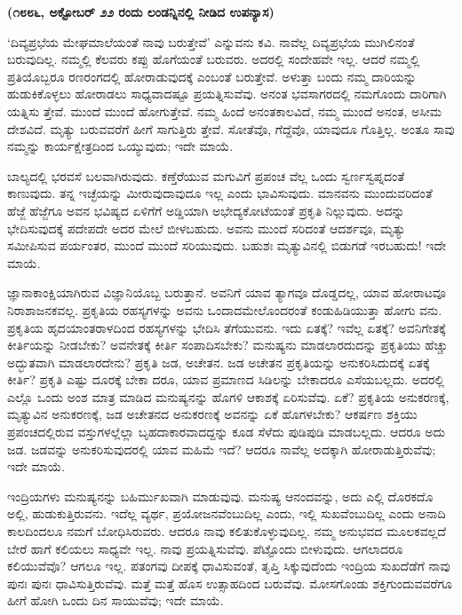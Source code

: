 \centerline{\textbf{(೧೮೮೬, ಅಕ್ಟೋಬರ್​ ೨೨ ರಂದು ಲಂಡನ್ನಿನಲ್ಲಿ ನೀಡಿದ ಉಪನ್ಯಾಸ)}}

‘ದಿವ್ಯಪ್ರಭೆಯ ಮೇಘಮಾಲೆಯಂತೆ ನಾವು ಬರುತ್ತೇವೆ’ ಎನ್ನುವನು ಕವಿ. ನಾವೆಲ್ಲ ದಿವ್ಯಪ್ರಭೆಯ ಮುಗಿಲಿನಂತೆ ಬರುವುದಿಲ್ಲ. ನಮ್ಮಲ್ಲಿ ಕೆಲವರು ಕಪ್ಪು ಹೊಗೆಯಂತೆ ಬರುವರು. ಅದರಲ್ಲಿ ಸಂದೇಹವೇ ಇಲ್ಲ. ಆದರೆ ನಮ್ಮಲ್ಲಿ ಪ್ರತಿಯೊಬ್ಬರೂ ರಣರಂಗದಲ್ಲಿ ಹೋರಾಡುವುದಕ್ಕೆ ಎಂಬಂತೆ ಬರುತ್ತೇವೆ. ಅಳುತ್ತಾ ಬಂದು ನಮ್ಮ ದಾರಿಯನ್ನು ಹುಡುಕಿಕೊಳ್ಳಲು ಹೋರಾಡಲು ಸಾಧ್ಯವಾದಷ್ಟೂ ಪ್ರಯತ್ನಿಸುವೆವು. ಅನಂತ ಭವಸಾಗರದಲ್ಲಿ ನಮಗೊಂದು ದಾರಿಗಾಗಿ ಯತ್ನಿಸು ತ್ತೇವೆ. ಮುಂದೆ ಮುಂದೆ ಹೋಗುತ್ತೇವೆ. ನಮ್ಮ ಹಿಂದೆ ಅನಂತಕಾಲವಿದೆ, ನಮ್ಮ ಮುಂದೆ ಅನಂತ, ಅಸೀಮ ದೇಶವಿದೆ. ಮೃತ್ಯು ಬರುವವರೆಗೆ ಹೀಗೆ ಸಾಗುತ್ತಿರು ತ್ತೇವೆ. ಸೋತೆವೊ, ಗೆದ್ದೆವೊ, ಯಾವುದೂ ಗೊತ್ತಿಲ್ಲ. ಅಂತೂ ಸಾವು ನಮ್ಮನ್ನು ಕಾರ್ಯಕ್ಷೇತ್ರದಿಂದ ಒಯ್ಯುವುದು; ಇದೇ ಮಾಯೆ.

ಬಾಲ್ಯದಲ್ಲಿ ಭರವಸೆ ಬಲವಾಗಿರುವುದು. ಕಣ್ತೆರೆಯುವ ಮಗುವಿಗೆ ಪ್ರಪಂಚ ವೆಲ್ಲ ಒಂದು ಸ್ವರ್ಣಸ್ವಪ್ನದಂತೆ ಕಾಣುವುದು. ತನ್ನ ಇಚ್ಛೆಯನ್ನು ಮೀರುವುದಾವುದೂ ಇಲ್ಲ ಎಂದು ಭಾವಿಸುವುದು. ಮಾನವನು ಮುಂದುವರಿದಂತೆ ಹೆಜ್ಜೆ ಹೆಜ್ಜೆಗೂ ಅವನ ಭವಿಷ್ಯದ ಏಳಿಗೆಗೆ ಅಡ್ಡಿಯಾಗಿ ಅಭೇದ್ಯಕೋಟೆಯಂತೆ ಪ್ರಕೃತಿ ನಿಲ್ಲುವುದು. ಅದನ್ನು ಭೇದಿಸುವುದಕ್ಕೆ ಪದೇಪದೇ ಅದರ ಮೇಲೆ ಬೀಳಬಹುದು. ಅವನು ಮುಂದೆ ಸರಿದಂತೆ ಆದರ್ಶವೂ, ಮೃತ್ಯು ಸಮೀಪಿಸುವ ಪರ್ಯಂತರ, ಮುಂದೆ ಮುಂದೆ ಸರಿಯುವುದು. ಬಹುಶಃ ಮೃತ್ಯುವಿನಲ್ಲಿ ಬಿಡುಗಡೆ ಇರಬಹುದು! ಇದೇ ಮಾಯೆ.

ಜ್ಞಾನಾಕಾಂಕ್ಷಿಯಾಗಿರುವ ವಿಜ್ಞಾನಿಯೊಬ್ಬ ಬರುತ್ತಾನೆ. ಅವನಿಗೆ ಯಾವ ತ್ಯಾಗವೂ ದೊಡ್ಡದಲ್ಲ, ಯಾವ ಹೋರಾಟವೂ ನಿರಾಶಾಜನಕವಲ್ಲ. ಪ್ರಕೃತಿಯ ರಹಸ್ಯಗಳನ್ನು ಅವನು ಒಂದಾದಮೇಲೊಂದರಂತೆ ಕಂಡುಹಿಡಿಯುತ್ತಾ ಹೋಗು ವನು. ಪ್ರಕೃತಿಯ ಹೃದಯಾಂತರಾಳದಿಂದ ರಹಸ್ಯಗಳನ್ನು ಭೇದಿಸಿ ತೆಗೆಯುವನು. ಇದು ಏತಕ್ಕೆ? ಇವೆಲ್ಲ ಏತಕ್ಕೆ? ಅವನಿಗೇತಕ್ಕೆ ಕೀರ್ತಿಯನ್ನು ನೀಡಬೇಕು? ಅವನೇತಕ್ಕೆ ಕೀರ್ತಿ ಸಂಪಾದಿಸಬೇಕು? ಮನುಷ್ಯನು ಮಾಡಲಾರದುದನ್ನು ಪ್ರಕೃತಿಯು ಹೆಚ್ಚು ಅದ್ಭುತವಾಗಿ ಮಾಡಲಾರದೇನು? ಪ್ರಕೃತಿ ಜಡ, ಅಚೇತನ. ಜಡ ಅಚೇತನ ಪ್ರಕೃತಿಯನ್ನು ಅನುಕರಿಸಿದುದಕ್ಕೆ ಏತಕ್ಕೆ ಕೀರ್ತಿ? ಪ್ರಕೃತಿ ಎಷ್ಟು ದೂರಕ್ಕೆ ಬೇಕಾ ದರೂ, ಯಾವ ಪ್ರಮಾಣದ ಸಿಡಿಲನ್ನು ಬೇಕಾದರೂ ಎಸೆಯಬಲ್ಲದು. ಅದರಲ್ಲಿ ಎಲ್ಲೊ ಒಂದು ಅಂಶ ಮಾತ್ರ ಮಾಡಿದ ಮನುಷ್ಯನನ್ನು ಹೊಗಳಿ ಆಕಾಶಕ್ಕೆ ಏರಿಸುವೆವು. ಏಕೆ? ಪ್ರಕೃತಿಯ ಅನುಕರಣಕ್ಕೆ, ಮೃತ್ಯುವಿನ ಅನುಕರಣಕ್ಕೆ, ಜಡ ಅಚೇತನದ ಅನುಕರಣಕ್ಕೆ ಅವನನ್ನು ಏಕೆ ಹೊಗಳಬೇಕು? ಆಕರ್ಷಣ ಶಕ್ತಿಯು ಪ್ರಪಂಚದಲ್ಲಿರುವ ವಸ್ತುಗಳಲ್ಲೆಲ್ಲಾ ಬೃಹದಾಕಾರವಾದದ್ದನ್ನು ಕೂಡ ಸೆಳೆದು ಪುಡಿಪುಡಿ ಮಾಡಬಲ್ಲದು. ಆದರೂ ಅದು ಜಡ. ಜಡವನ್ನು ಅನುಕರಿಸುವುದರಲ್ಲಿ ಯಾವ ಮಹಿಮೆ ಇದೆ? ಆದರೂ ನಾವೆಲ್ಲ ಅದಕ್ಕಾಗಿ ಹೋರಾಡುತ್ತಿರುವೆವು; ಇದೇ ಮಾಯೆ.

ಇಂದ್ರಿಯಗಳು ಮನುಷ್ಯನನ್ನು ಬಹಿರ್ಮುಖವಾಗಿ ಮಾಡುವುವು. ಮನುಷ್ಯ ಆನಂದವನ್ನು, ಅದು ಎಲ್ಲಿ ದೊರಕದೊ ಅಲ್ಲಿ, ಹುಡುಕುತ್ತಿರುವನು. ಇದೆಲ್ಲ ವ್ಯರ್ಥ, ಪ್ರಯೋಜನವೆಂಬುದಿಲ್ಲ ಎಂದು, ಇಲ್ಲಿ ಸುಖವೆಂಬುದಿಲ್ಲ ಎಂದು ಅನಾದಿ ಕಾಲದಿಂದಲೂ ನಮಗೆ ಬೋಧಿಸಿರುವರು. ಆದರೂ ನಾವು ಕಲಿತುಕೊಳ್ಳುವುದಿಲ್ಲ. ನಮ್ಮ ಅನುಭವದ ಮೂಲಕವಲ್ಲದೆ ಬೇರೆ ಹಾಗೆ ಕಲಿಯಲು ಸಾಧ್ಯವೇ ಇಲ್ಲ. ನಾವು ಪ್ರಯತ್ನಿಸುವೆವು. ಪೆಟ್ಟೊಂದು ಬೀಳುವುದು. ಆಗಲಾದರೂ ಕಲಿಯುವೆವೊ? ಆಗಲೂ ಇಲ್ಲ. ಪತಂಗವು ದೀಪಕ್ಕೆ ಧಾವಿಸುವಂತೆ, ತೃಪ್ತಿ ಸಿಕ್ಕುವುದೆಂದು ಇಂದ್ರಿಯ ಸುಖದೆಡೆಗೆ ನಾವು ಪುನಃ ಪುನಃ ಧಾವಿಸುತ್ತಿರುವೆವು. ಮತ್ತೆ ಮತ್ತೆ ಹೊಸ ಉತ್ಸಾಹದಿಂದ ಬರುವೆವು. ಮೋಸಗೊಂಡು ಶಕ್ತಿಗುಂದುವವರೆಗೂ ಹೀಗೆ ಹೋಗಿ ಒಂದು ದಿನ ಸಾಯುವೆವು; ಇದೇ ಮಾಯೆ.

